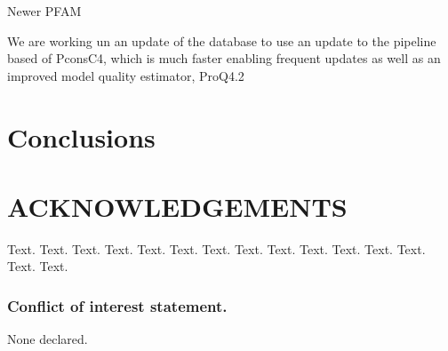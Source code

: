 \documentclass[a4,center,fleqn]{NAR}
\begin{document}
Newer PFAM


We are working un an  update of the 
database to use an update to the pipeline based of PconsC4, which is
much faster enabling frequent updates as well as an improved model
quality estimator, ProQ4.2

\section{Conclusions}





\section{ACKNOWLEDGEMENTS}

Text. Text. Text. Text. Text. Text. Text. Text. Text. Text. Text.
Text. Text. Text. Text.


\subsubsection{Conflict of interest statement.} None declared.



\end{document}
